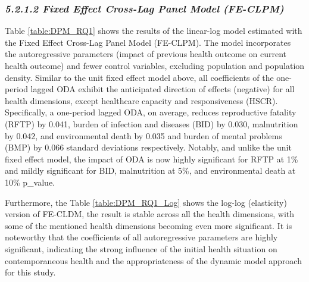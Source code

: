 \subsubsection*{\quad \quad \textit{5.2.1.2 Fixed Effect Cross-Lag Panel Model (FE-CLPM)}}
Table \ref{table:DPM_RQ1} shows the results of the linear-log model estimated with the Fixed Effect Cross-Lag Panel Model (FE-CLPM). The model incorporates the autoregressive parameters (impact of previous health outcome on current health outcome) and fewer control variables, excluding population and population density. Similar to the unit fixed effect model above, all coefficients of the one-period lagged ODA exhibit the anticipated direction of effects (negative) for all health dimensions, except healthcare capacity and responsiveness (HSCR). Specifically, a one-period lagged ODA, on average, reduces reproductive fatality (RFTP) by 0.041, burden of infection and diseases (BID) by 0.030, malnutrition by 0.042, and environmental death by 0.035 and burden of mental problems (BMP) by 0.066 standard deviations respectively. Notably, and unlike the unit fixed effect model, the impact of ODA is now highly significant for RFTP at 1\% and mildly significant for BID, malnutrition at 5\%, and environmental death at 10\% p\_value. 

Furthermore, the Table \ref{table:DPM_RQ1_Log} shows the log-log (elasticity) version of FE-CLDM, the result is stable across all the health dimensions, with some of the mentioned health dimensions becoming even more significant. It is noteworthy that the coefficients of all autoregressive parameters are highly significant, indicating the strong influence of the initial health situation on contemporaneous health and the appropriateness of the dynamic model approach for this study. 





